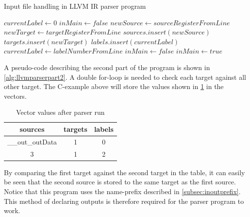 \algnewcommand{}
\algnewcommand{}
\begin{algorithm}
  \caption{Input file handling in LLVM IR parser program
  \label{alg:llvmparserpart1}}
  \begin{algorithmic}[1]
    \Statex
    \State $currentLabel \leftarrow 0$
    \State $inMain \leftarrow false$
            \State $newSource \leftarrow sourceRegisterFromLine$
            \State $newTarget \leftarrow targetRegisterFromLine$
            \State $sources.insert(newSource)$
            \State $targets.insert(newTarget)$
            \State $labels.insert(currentLabel)$
            \State $currentLabel \leftarrow labelNumberFromLine$
            \State $inMain \leftarrow false$
          \EndIf
          \State $inMain \leftarrow true$
        \EndIf
      \EndWhile
    \EndIf
  \end{algorithmic}
\end{algorithm}
A pseudo-code describing the second part of the program is shown in \cref{alg:llvmparserpart2}. A double for-loop is needed to check each target against all other target. The C-example above will store the values shown in \cref{tab:llvmirparservectors} in the vectors. 
\begin{table}[hbtp]
    \centering
    \begin{tabular}{ccc}
    \textbf{sources} & \textbf{targets} & \textbf{labels} \\
    \toprule
      \_\_out\_outData & 1 & 0 \\
      3 & 1 & 2 \\
    \bottomrule
    \end{tabular}
    \caption{Vector values after parser run}
    \label{tab:llvmirparservectors}
\end{table}
By comparing the first target against the second target in the table, it can easily be seen that the second source is stored to the same target as the first source. Notice that this program uses the name-prefix described in \cref{subsec:inoutprefix}. This method of declaring outputs is therefore required for the parser program to work. 
